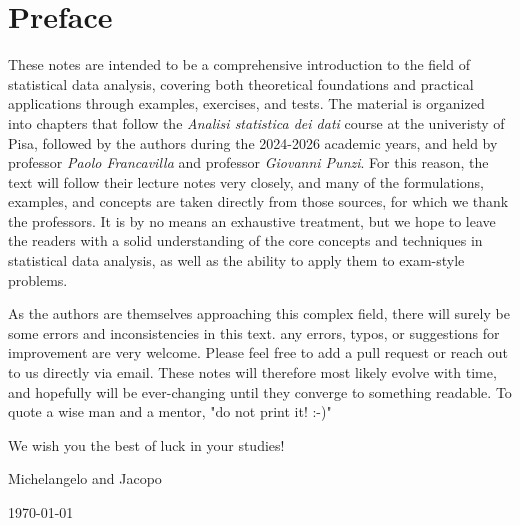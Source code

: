 \chapter*{Preface}
These notes are intended to be a comprehensive introduction to the field of statistical data analysis, 
covering both theoretical foundations and practical applications through examples, exercises, and tests. 
The material is organized into chapters that  follow the \textit{Analisi statistica dei dati} course at the univeristy of Pisa,
followed by the authors during the 2024-2026 academic years, and held by professor \textit{Paolo Francavilla} and professor \textit{Giovanni Punzi}. For this reason, the text will follow their lecture notes very closely, and many of the formulations, examples, and concepts are taken directly from those sources, for which we thank the professors. It is by no means an exhaustive treatment, but we hope to leave the readers with a solid understanding of the core concepts and techniques in statistical data analysis, as well as the ability to apply them to exam-style problems.

As the authors are themselves approaching this complex field, there will surely be some errors and inconsistencies in this text. any errors, typos, or suggestions for improvement are very welcome. Please feel free to add a pull request or reach out to us directly via email. These notes will therefore most likely evolve with time, and hopefully will be ever-changing until they converge to something readable. To quote a wise man and a mentor, "do not print it! :-)"

We wish you the best of luck in your studies!


\quad


Michelangelo and Jacopo



\today